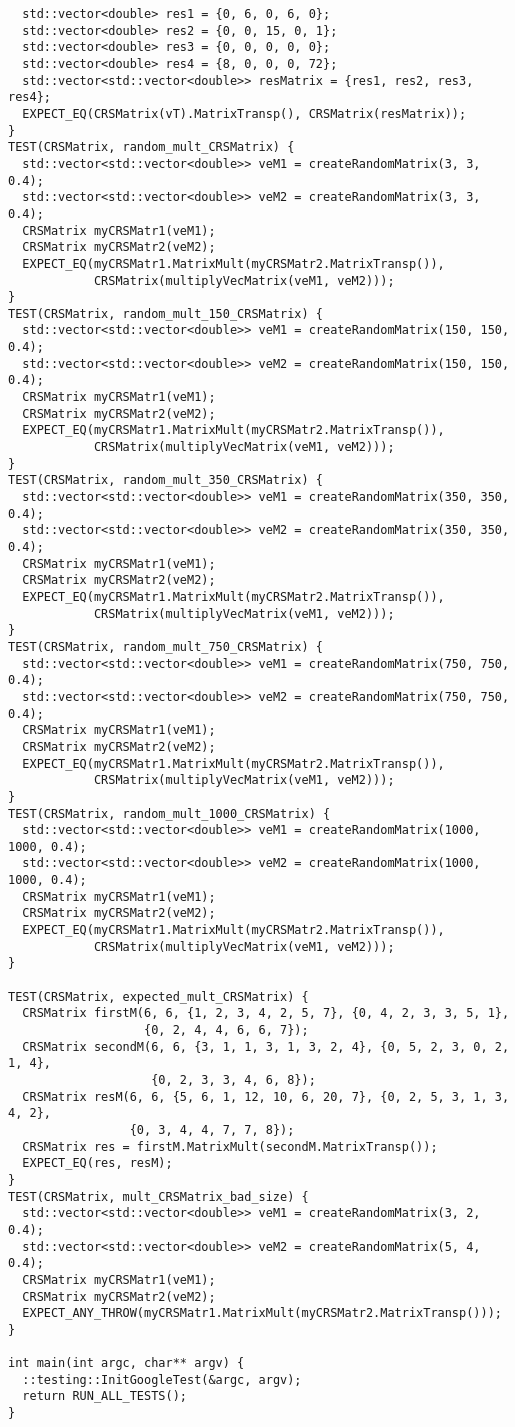 \documentclass[14pt, russian]{extarticle}
\begin{document}
\begin{lstlisting}
  std::vector<double> res1 = {0, 6, 0, 6, 0};
  std::vector<double> res2 = {0, 0, 15, 0, 1};
  std::vector<double> res3 = {0, 0, 0, 0, 0};
  std::vector<double> res4 = {8, 0, 0, 0, 72};
  std::vector<std::vector<double>> resMatrix = {res1, res2, res3, res4};
  EXPECT_EQ(CRSMatrix(vT).MatrixTransp(), CRSMatrix(resMatrix));
}
TEST(CRSMatrix, random_mult_CRSMatrix) {
  std::vector<std::vector<double>> veM1 = createRandomMatrix(3, 3, 0.4);
  std::vector<std::vector<double>> veM2 = createRandomMatrix(3, 3, 0.4);
  CRSMatrix myCRSMatr1(veM1);
  CRSMatrix myCRSMatr2(veM2);
  EXPECT_EQ(myCRSMatr1.MatrixMult(myCRSMatr2.MatrixTransp()),
            CRSMatrix(multiplyVecMatrix(veM1, veM2)));
}
TEST(CRSMatrix, random_mult_150_CRSMatrix) {
  std::vector<std::vector<double>> veM1 = createRandomMatrix(150, 150, 0.4);
  std::vector<std::vector<double>> veM2 = createRandomMatrix(150, 150, 0.4);
  CRSMatrix myCRSMatr1(veM1);
  CRSMatrix myCRSMatr2(veM2);
  EXPECT_EQ(myCRSMatr1.MatrixMult(myCRSMatr2.MatrixTransp()),
            CRSMatrix(multiplyVecMatrix(veM1, veM2)));
}
TEST(CRSMatrix, random_mult_350_CRSMatrix) {
  std::vector<std::vector<double>> veM1 = createRandomMatrix(350, 350, 0.4);
  std::vector<std::vector<double>> veM2 = createRandomMatrix(350, 350, 0.4);
  CRSMatrix myCRSMatr1(veM1);
  CRSMatrix myCRSMatr2(veM2);
  EXPECT_EQ(myCRSMatr1.MatrixMult(myCRSMatr2.MatrixTransp()),
            CRSMatrix(multiplyVecMatrix(veM1, veM2)));
}
TEST(CRSMatrix, random_mult_750_CRSMatrix) {
  std::vector<std::vector<double>> veM1 = createRandomMatrix(750, 750, 0.4);
  std::vector<std::vector<double>> veM2 = createRandomMatrix(750, 750, 0.4);
  CRSMatrix myCRSMatr1(veM1);
  CRSMatrix myCRSMatr2(veM2);
  EXPECT_EQ(myCRSMatr1.MatrixMult(myCRSMatr2.MatrixTransp()),
            CRSMatrix(multiplyVecMatrix(veM1, veM2)));
}
TEST(CRSMatrix, random_mult_1000_CRSMatrix) {
  std::vector<std::vector<double>> veM1 = createRandomMatrix(1000, 1000, 0.4);
  std::vector<std::vector<double>> veM2 = createRandomMatrix(1000, 1000, 0.4);
  CRSMatrix myCRSMatr1(veM1);
  CRSMatrix myCRSMatr2(veM2);
  EXPECT_EQ(myCRSMatr1.MatrixMult(myCRSMatr2.MatrixTransp()),
            CRSMatrix(multiplyVecMatrix(veM1, veM2)));
}

TEST(CRSMatrix, expected_mult_CRSMatrix) {
  CRSMatrix firstM(6, 6, {1, 2, 3, 4, 2, 5, 7}, {0, 4, 2, 3, 3, 5, 1},
                   {0, 2, 4, 4, 6, 6, 7});
  CRSMatrix secondM(6, 6, {3, 1, 1, 3, 1, 3, 2, 4}, {0, 5, 2, 3, 0, 2, 1, 4},
                    {0, 2, 3, 3, 4, 6, 8});
  CRSMatrix resM(6, 6, {5, 6, 1, 12, 10, 6, 20, 7}, {0, 2, 5, 3, 1, 3, 4, 2},
                 {0, 3, 4, 4, 7, 7, 8});
  CRSMatrix res = firstM.MatrixMult(secondM.MatrixTransp());
  EXPECT_EQ(res, resM);
}
TEST(CRSMatrix, mult_CRSMatrix_bad_size) {
  std::vector<std::vector<double>> veM1 = createRandomMatrix(3, 2, 0.4);
  std::vector<std::vector<double>> veM2 = createRandomMatrix(5, 4, 0.4);
  CRSMatrix myCRSMatr1(veM1);
  CRSMatrix myCRSMatr2(veM2);
  EXPECT_ANY_THROW(myCRSMatr1.MatrixMult(myCRSMatr2.MatrixTransp()));
}

int main(int argc, char** argv) {
  ::testing::InitGoogleTest(&argc, argv);
  return RUN_ALL_TESTS();
}

    \end{lstlisting}
\end{document}
